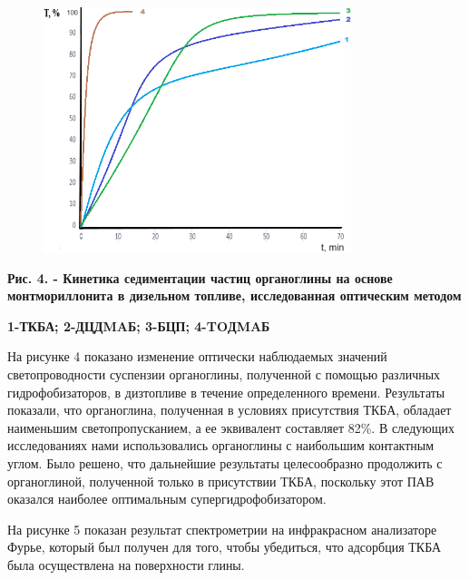 \begin{figure}[H]
	\centering
	\includegraphics[width=0.8\textwidth]{assets/1028}
	\caption*{}
\end{figure}

\textbf{Рис. 4. - Кинетика седиментации частиц органоглины на основе
монтмориллонита в дизельном топливе, исследованная оптическим методом}

\textbf{1-ТКБА; 2-ДЦДMAБ; 3-БЦП; 4-TOДMAБ}

На рисунке 4 показано изменение оптически наблюдаемых значений
светопроводности суспензии органоглины, полученной с помощью различных
гидрофобизаторов, в дизтопливе в течение определенного времени.
Результаты показали, что органоглина, полученная в условиях присутствия
ТКБА, обладает наименьшим светопропусканием, а ее эквивалент составляет
82\%. В следующих исследованиях нами использовались органоглины с
наибольшим контактным углом. Было решено, что дальнейшие результаты
целесообразно продолжить с органоглиной, полученной только в присутствии
ТКБА, поскольку этот ПАВ оказался наиболее оптимальным
супергидрофобизатором.

На рисунке 5 показан результат спектрометрии на инфракрасном анализаторе
Фурье, который был получен для того, чтобы убедиться, что адсорбция ТКБА
была осуществлена на поверхности глины.

